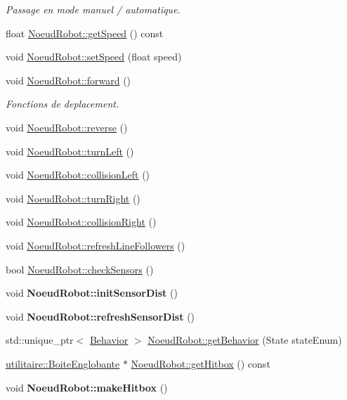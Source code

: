 \begin{DoxyCompactItemize}
\begin{DoxyCompactList}\small\item\em Passage en mode manuel / automatique. \end{DoxyCompactList}\item 
float \hyperlink{group__inf2990_ga249b8466a20a60fbe7cc46f6e36af62a}{Noeud\-Robot\-::get\-Speed} () const 
\item 
void \hyperlink{group__inf2990_ga559df4c524257f953817bc6b22a467bc}{Noeud\-Robot\-::set\-Speed} (float speed)
\item 
void \hyperlink{group__inf2990_gafa5754bd3c4612519224e23f6afc78ff}{Noeud\-Robot\-::forward} ()
\begin{DoxyCompactList}\small\item\em Fonctions de deplacement. \end{DoxyCompactList}\item 
void \hyperlink{group__inf2990_ga33f628d3ada8ae939a648769e4573783}{Noeud\-Robot\-::reverse} ()
\item 
void \hyperlink{group__inf2990_ga792618ae4dc0d65f9d86c972d3b0d4a5}{Noeud\-Robot\-::turn\-Left} ()
\item 
void \hyperlink{group__inf2990_ga149d6f3dcca1da160fb96ff54640ae07}{Noeud\-Robot\-::collision\-Left} ()
\item 
void \hyperlink{group__inf2990_gafef0435e35696dcccf9b200b6df7913a}{Noeud\-Robot\-::turn\-Right} ()
\item 
void \hyperlink{group__inf2990_ga14b1c17d14b0a924108913c83ac23349}{Noeud\-Robot\-::collision\-Right} ()
\item 
void \hyperlink{group__inf2990_ga618e0871bd8fe677fe0c2b1cf1a1a8b7}{Noeud\-Robot\-::refresh\-Line\-Followers} ()
\item 
bool \hyperlink{group__inf2990_ga44545d3ce953677f2380423041e2fdc6}{Noeud\-Robot\-::check\-Sensors} ()
\item 
\hypertarget{group__inf2990_ga80efd494c54af60ce2597e1819c8dea4}{void {\bfseries Noeud\-Robot\-::init\-Sensor\-Dist} ()}\label{group__inf2990_ga80efd494c54af60ce2597e1819c8dea4}

\item 
\hypertarget{group__inf2990_ga53f132a7876b353dd8a46164f6e19135}{void {\bfseries Noeud\-Robot\-::refresh\-Sensor\-Dist} ()}\label{group__inf2990_ga53f132a7876b353dd8a46164f6e19135}

\item 
std\-::unique\-\_\-ptr$<$ \hyperlink{class_behavior}{Behavior} $>$ \hyperlink{group__inf2990_ga2ab91f95ea7a04f910907663f7f5a5a4}{Noeud\-Robot\-::get\-Behavior} (State state\-Enum)
\item 
\hyperlink{structutilitaire_1_1_boite_englobante}{utilitaire\-::\-Boite\-Englobante} $\ast$ \hyperlink{group__inf2990_ga1b9729298f653ae025f91d362764465e}{Noeud\-Robot\-::get\-Hitbox} () const 
\item 
\hypertarget{group__inf2990_gafe5ebc40e36ac92eb3e9957748ba93c1}{void {\bfseries Noeud\-Robot\-::make\-Hitbox} ()}\label{group__inf2990_gafe5ebc40e36ac92eb3e9957748ba93c1}


\end{DoxyCompactItemize}
